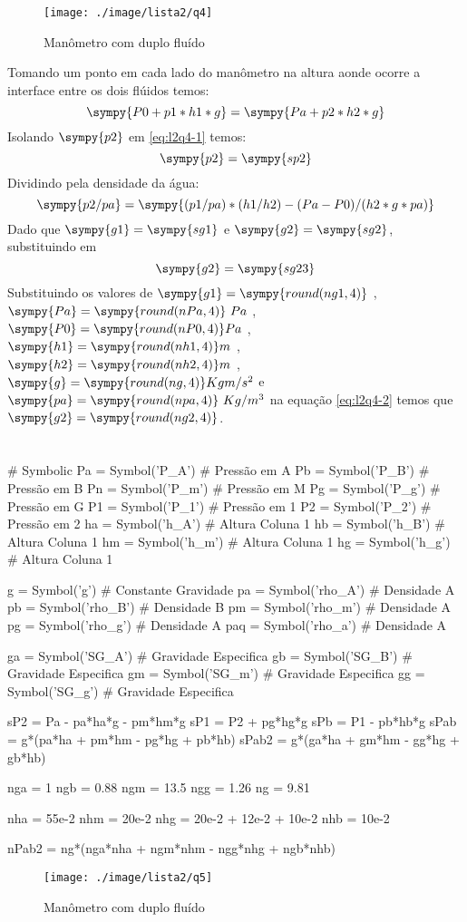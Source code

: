 \documentclass[a4paper,twocolumn,11pt]{article}
\newcommand{\npy}[1]{\sympy{round(n#1,4)}}
\newcommand{\epy}[1]{\sympy{#1} = \sympy{s#1}}
\newcommand{\nnpy}[1]{\sympy{#1} = \sympy{round(n#1,4)}}
\begin{document}
\begin{figure}[H]
\centering
\label{fig:l2q4}
\texttt{[image: ./image/lista2/q4]}
\caption{Manômetro com duplo fluído}
\end{figure}

Tomando um ponto em cada lado do manômetro na altura aonde ocorre a interface entre os dois flúidos temos:
\begin{equation}\label{eq:l2q4-1}
\sympy{P0 + p1*h1*g} = \sympy{Pa + p2*h2*g}
\end{equation}
Isolando $\sympy{p2}$ em \eqref{eq:l2q4-1} temos:
$$
\sympy{p2}=\sympy{sp2}
$$
Dividindo pela densidade da água:
$$
\sympy{p2/pa}=\sympy{(p1/pa)*(h1/h2) - (Pa-P0)/(h2*g*pa)}
$$
Dado que $\epy{g1}$ e $\epy{g2}$, substituindo em 
\begin{equation}\label{eq:l2q4-2}
\sympy{g2}=\sympy{sg23}%
\end{equation}
Substituindo os valores de $\nnpy{g1}$ , $\nnpy{Pa}\ Pa$ , $\nnpy{P0} Pa$ , $\nnpy{h1} m$ , $\nnpy{h2} m$ , $\nnpy{g} Kg m/s^2$ e $\nnpy{pa}\ Kg/m^3$ na equação \eqref{eq:l2q4-2} temos que $\nnpy{g2}$.

\section{} %

\begin{sympycode}
# Symbolic
Pa = Symbol('P_A') # Pressão em A
Pb = Symbol('P_B') # Pressão em B
Pn = Symbol('P_m') # Pressão em M
Pg = Symbol('P_g') # Pressão em G
P1 = Symbol('P_1') # Pressão em 1
P2 = Symbol('P_2') # Pressão em 2
ha = Symbol('h_A') # Altura Coluna 1
hb = Symbol('h_B') # Altura Coluna 1
hm = Symbol('h_m') # Altura Coluna 1
hg = Symbol('h_g') # Altura Coluna 1

g = Symbol('g') # Constante Gravidade
pa = Symbol('rho_A') # Densidade A
pb = Symbol('rho_B') # Densidade B
pm = Symbol('rho_m') # Densidade A
pg = Symbol('rho_g') # Densidade A
paq = Symbol('rho_a') # Densidade A

ga = Symbol('SG_A') # Gravidade Especifica
gb = Symbol('SG_B') # Gravidade Especifica
gm = Symbol('SG_m') # Gravidade Especifica
gg = Symbol('SG_g') # Gravidade Especifica

sP2 = Pa - pa*ha*g - pm*hm*g
sP1 = P2 + pg*hg*g
sPb = P1 - pb*hb*g
sPab  = g*(pa*ha + pm*hm - pg*hg + pb*hb)
sPab2  = g*(ga*ha + gm*hm - gg*hg + gb*hb)

nga = 1
ngb = 0.88
ngm = 13.5
ngg = 1.26
ng = 9.81

nha = 55e-2
nhm = 20e-2
nhg = 20e-2 + 12e-2 + 10e-2
nhb = 10e-2

nPab2  = ng*(nga*nha + ngm*nhm - ngg*nhg + ngb*nhb)

\end{sympycode}
\begin{figure}[H]
\centering
\label{fig:l2q5}
\texttt{[image: ./image/lista2/q5]}
\caption{Manômetro com duplo fluído}
\end{figure}
\end{document}
